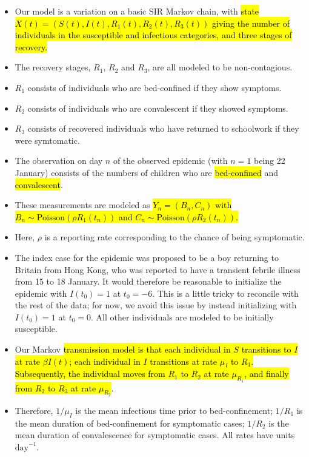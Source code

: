 \documentclass[]{article}
\begin{document}
\begin{itemize}
\item
  Our model is a variation on a basic SIR Markov chain, with \hl{state
  $X(t)=(S(t),I(t),R_1(t),R_2(t),R_3(t) )$ giving the number of
  individuals in the susceptible and infectious categories, and three
  stages of recovery.}
\item
  The recovery stages, \(R_1\), \(R_2\) and \(R_3\), are all modeled to
  be non-contagious.
\item
  \(R_1\) consists of individuals who are bed-confined if they show
  symptoms.
\item
  \(R_2\) consists of individuals who are convalescent if they showed
  symptoms.
\item
  \(R_3\) consists of recovered individuals who have returned to
  schoolwork if they were symtomatic.
\item
  The observation on day \(n\) of the observed epidemic (with \(n=1\)
  being 22 January) consists of the numbers of children who are
  \hl{bed-confined} and \hl{convalescent}.
\item
  These measurements are modeled as \hl{$Y_n=(B_n,C_n)$ with
  $B_n\sim\mathrm{Poisson}(\rho R_1(t_n))$ and
  $C_n\sim\mathrm{Poisson}(\rho R_2(t_n))$.}
\item
  Here, \(\rho\) is a reporting rate corresponding to the chance of
  being symptomatic.
\item
  The index case for the epidemic was proposed to be a boy returning to
  Britain from Hong Kong, who was reported to have a transient febrile
  illness from 15 to 18 January. It would therefore be reasonable to
  initialize the epidemic with \(I(t_0)=1\) at \(t_0=-6\). This is a
  little tricky to reconcile with the rest of the data; for now, we
  avoid this issue by instead initializing with \(I(t_0)=1\) at
  \(t_0=0\). All other individuals are modeled to be initially
  susceptible.
\item
  Our Markov \hl{transmission model is that each individual in $S$
  transitions to $I$ at rate $\beta I(t)$; each individual in $I$
  transitions at rate $\mu_I$ to $R_1$. Subsequently, the individual
  moves from $R_1$ to $R_2$ at rate $\mu_{R_1}$, and finally from
  $R_2$ to $R_3$ at rate $\mu_{R_2}$}.
\item
  Therefore, \(1/\mu_I\) is the mean infectious time prior to
  bed-confinement; \(1/R_1\) is the mean duration of bed-confinement for
  symptomatic cases; \(1/R_2\) is the mean duration of convalescence for
  symptomatic cases. All rates have units \(\mathrm{day}^{-1}\).

\end{itemize}
\end{document}
